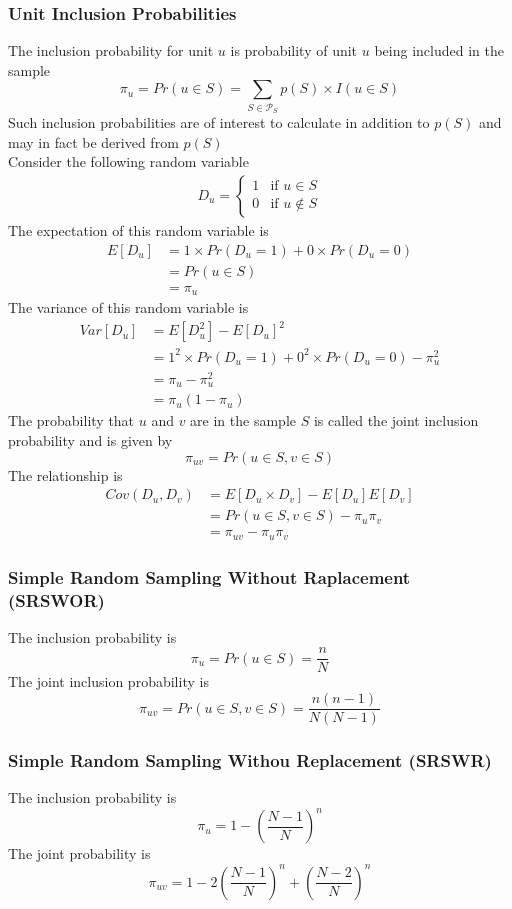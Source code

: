 \documentclass[11pt]{article}
\begin{document}
\subsubsection{Unit Inclusion Probabilities}
The inclusion probability for unit $u$ is probability of unit $u$ being included in the sample 
\[\pi_u = Pr(u\in S) = \sum_{S\in\mathcal{P}_S}p(S)\times I(u\in S)\]    
Such inclusion probabilities are of interest to calculate in addition to $p(S)$ and may in fact be derived from $p(S)$ \\
Consider the following random variable 
\begin{align*}
    D_u = \begin{cases}
        1 & \text{if } u\in S \\
        0 & \text{if } u\notin S
    \end{cases}
\end{align*}
The expectation of this random variable is 
\begin{align*}
    E[D_u] &= 1\times Pr(D_u=1) + 0\times Pr(D_u=0) \\
           &= Pr(u\in S) \\
           &= \pi_u
\end{align*}
The variance of this random variable is 
\begin{align*}
    Var[D_u] &= E[D_u^2] - E[D_u]^2 \\
             &= 1^2\times Pr(D_u=1) + 0^2\times Pr(D_u=0) - \pi_u^2 \\
             &= \pi_u - \pi_u^2 \\
             &= \pi_u(1-\pi_u)
\end{align*}
The probability that $u$ and $v$ are in the sample $S$ is called the joint inclusion probability and is given by 
\[\pi_{uv} = Pr(u\in S, v\in S)\]
The relationship is 
\begin{align*}
    Cov(D_u,D_v) &= E[D_u\times D_v] - E[D_u]E[D_v] \\
               &= Pr(u\in S, v\in S) - \pi_u\pi_v \\
               &= \pi_{uv} - \pi_u\pi_v
\end{align*}
\subsubsection*{Simple Random Sampling Without Raplacement (SRSWOR)}
The inclusion probability is 
\[\pi_u = Pr(u\in S) = \frac{n}{N}\]
The joint inclusion probability is
\[\pi_{uv} = Pr(u\in S, v\in S) = \frac{n(n-1)}{N(N-1)}\]
\subsubsection*{Simple Random Sampling Withou Replacement (SRSWR)}
The inclusion probability is 
\[\pi_u = 1 - \left(\frac{N-1}{N}\right)^n\]
The joint probability is 
\[\pi_{uv} = 1 - 2\left(\frac{N-1}{N}\right)^n + \left(\frac{N-2}{N}\right)^{n}\]
\end{document}
